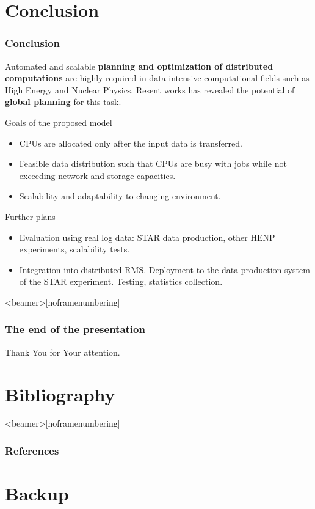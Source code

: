 \documentclass{beamer}
\begin{document}
\section{Conclusion}

\begin{frame}\frametitle{Conclusion}
     Automated and scalable \textbf{planning and optimization of distributed computations} are highly required in     data intensive computational fields such as High Energy and Nuclear Physics. Resent works has revealed the potential of \textbf{global planning} for this task.
  \begin{block}{Goals of the proposed model}

    \begin{itemize}
      \item CPUs are allocated only after the input data is transferred.
      \item Feasible data distribution such that CPUs are busy with jobs while not exceeding network and storage capacities.
      \item Scalability and adaptability to changing environment.
    \end{itemize}
  \end{block}

  \begin{block}{Further plans}
    \begin{itemize}
      \item Evaluation using real log data: STAR data production, other HENP experiments, scalability tests. 
      \item Integration into distributed RMS. Deployment to the data production system of the STAR experiment. Testing, statistics collection. 
    \end{itemize}
   \end{block}
  \end{frame}


\begin{frame}<beamer>[noframenumbering]\frametitle{The end of the presentation}
\begin{center}
Thank You for Your attention.
\end{center}
\end{frame}

\section*{Bibliography}


\begin{frame}<beamer>[noframenumbering]\frametitle{References}
\nocite{Rudova}
\renewcommand*{\bibfont}{\tiny}
\printbibliography[notkeyword=my]
\end{frame}

\section*{Backup}
\end{document}
